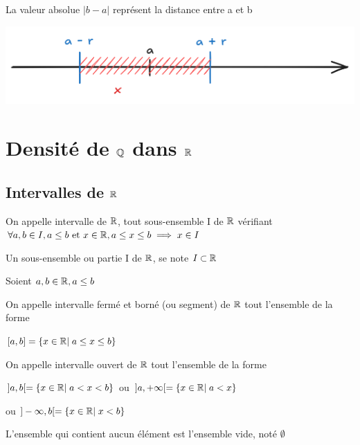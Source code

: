 \documentclass[a4paper, 12pt]{article}
\begin{document}
\begin{remark}
    La valeur absolue $|b - a|$ représent la distance entre a et b
\end{remark}

\includegraphics[width=\textwidth]{images/neightborhood.png}

\section{Densité de $\mathbb{Q}$ dans $\mathbb{R}$}

\subsection{Intervalles de $\mathbb{R}$}

\begin{definition}
    On appelle intervalle de $\mathbb{R}$, tout sous-ensemble I de $\mathbb{R}$ vérifiant
    $\forall a, b \in I, a \leq b \text{ et } x \in \mathbb{R}, a \leq x \leq b \implies x \in I$
\end{definition}

\begin{remark}
    Un sous-ensemble ou partie I de $\mathbb{R}$, se note $I \subset \mathbb{R}$
\end{remark}

\begin{definition}
    Soient $a, b \in \mathbb{R}, a \leq b$

    On appelle intervalle fermé et borné (ou segment) de $\mathbb{R}$ tout l'ensemble de la forme

    $[a, b] = \{x \in \mathbb{R} | \; a \leq x \leq b\}$
    
    \vspace{0.5em}

    On appelle intervalle ouvert de $\mathbb{R}$ tout l'ensemble de la forme

    $]a, b[ = \{x \in \mathbb{R} | \; a < x < b\}$
    \quad ou \quad
    $]a, +\infty[ = \{x \in \mathbb{R} | \; a < x\}$
    \par ou \quad
    $]-\infty, b[ = \{x \in \mathbb{R} | \; x < b\}$
\end{definition}

\begin{remark}
    L'ensemble qui contient aucun élément est l'ensemble vide, noté $\emptyset$
\end{remark}
\end{document}
